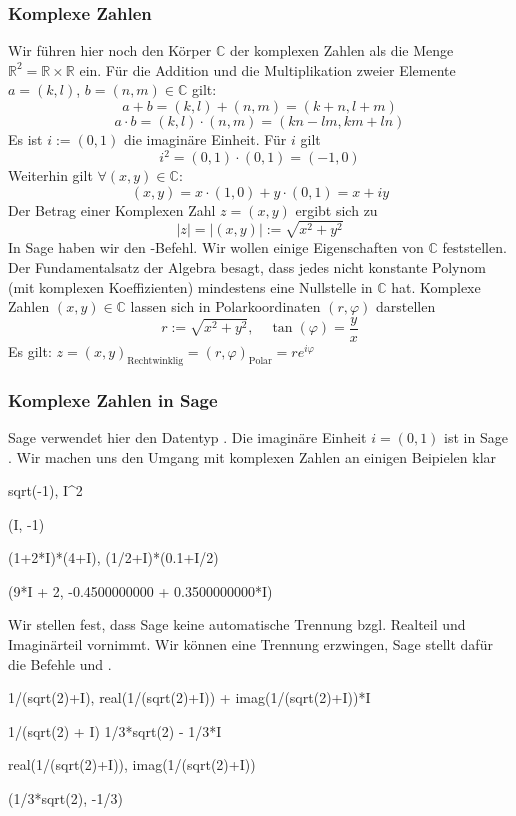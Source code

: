 \documentclass[fontsize=12pt,paper=a4,twoside,bibtotoc,idxtotoc,
liststotoc,pagesize,BCOR1.2cm,DIV15,chapterprefix,pagesize=pdftex]{scrbook}
\theoremstyle{plain}
\theoremstyle{definition}
\theoremstyle{remark}
\begin{document}
\subsubsection{Komplexe Zahlen}
Wir führen hier noch den Körper $\mathbb{C}$ der komplexen Zahlen als die Menge $\mathbb{R}^2=\mathbb{R} \times \mathbb{R}$ ein. 
Für die Addition und die Multiplikation zweier Elemente $a=(k,l)$, $b=(n,m)\in \mathbb{C}$ gilt: 
\[a+b=(k,l)+(n,m)=(k+n,l+m)\]
\[a\cdot b= (k,l) \cdot (n,m) = (kn-lm, km+ln) \]
Es ist $i:=(0,1)$ die imaginäre Einheit. Für $i$ gilt
\[ i^2=(0,1) \cdot (0,1) = (-1,0) \]
Weiterhin gilt  $\forall (x,y) \in \mathbb{C}:$
\[(x,y)=x \cdot (1,0) + y \cdot (0,1)= x +i y\]
Der Betrag einer Komplexen Zahl $z=(x,y)$ ergibt sich zu
\[|z|=|(x,y)|:=\sqrt{x^2+y^2}\]
In Sage haben wir den -Befehl. Wir wollen einige Eigenschaften von $\mathbb{C}$ feststellen.
Der Fundamentalsatz der Algebra besagt, dass jedes nicht konstante Polynom (mit komplexen Koeffizienten) mindestens eine Nullstelle in $\mathbb{C}$ hat. 
Komplexe Zahlen $(x,y) \in \mathbb{C}$ lassen sich in Polarkoordinaten $(r, \varphi)$ darstellen 
\[  r:= \sqrt{x^2+y^2}, \quad \tan(\varphi)=\frac{y}{x} \] 
Es gilt: $z = (x,y)_{\text{Rechtwinklig}} = (r,\varphi)_{\text{Polar}} = re^{i\varphi}$
\subsubsection{Komplexe Zahlen in Sage}
Sage verwendet hier den Datentyp .
 Die imaginäre Einheit $i=(0,1)$ ist in Sage .
Wir machen uns den Umgang mit komplexen Zahlen an einigen Beipielen klar
\begin{sagein}
sqrt(-1), I^2
\end{sagein}
\begin{sage}
(I, -1)
\end{sage}
\begin{sagein}
(1+2*I)*(4+I), (1/2+I)*(0.1+I/2)
\end{sagein}
\begin{sage}
 (9*I + 2, -0.4500000000 + 0.3500000000*I)
\end{sage}
Wir stellen fest, dass Sage keine automatische Trennung bzgl. Realteil und  Imaginärteil vornimmt. Wir können eine Trennung erzwingen, 
Sage stellt dafür die Befehle  und .
\begin{sagein}
1/(sqrt(2)+I), real(1/(sqrt(2)+I)) + imag(1/(sqrt(2)+I))*I
\end{sagein}
\begin{sage}
1/(sqrt(2) + I)
1/3*sqrt(2) - 1/3*I
\end{sage}
\begin{sagein}
real(1/(sqrt(2)+I)), imag(1/(sqrt(2)+I))
\end{sagein}
\begin{sage}
(1/3*sqrt(2), -1/3)
\end{sage}
\end{document}

